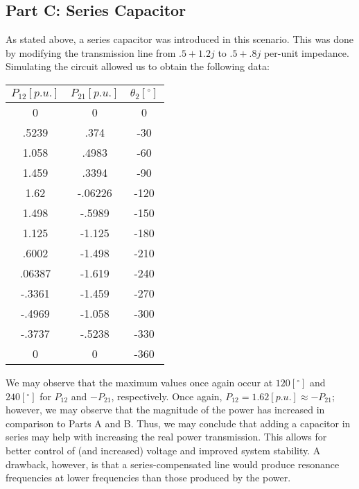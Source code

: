 \documentclass[
	letterpaper, %
	10pt, %
]{CSUniSchoolLabReport}
\begin{document}
\subsection{Part C: Series Capacitor}

As stated above, a series capacitor was introduced in this scenario. This was done by modifying the transmission line from $.5+1.2j$ to $.5+.8j$ per-unit impedance. Simulating the circuit allowed us to obtain the following data:

\begin{center}
  \begin{tabular}[H]{|c|c|c|}
    \hline
    $P_{12}[p.u.]$ & $P_{21}[p.u.]$ & $\theta_2[^{\circ}]$\\
    \hline
    0 & 0 & 0\\
    \hline
    .5239 & .374 & -30\\
    \hline
    1.058 & .4983 & -60\\
    \hline
    1.459 & .3394 & -90\\
    \hline
    \cellcolor{green} 1.62  & -.06226 & -120\\
    \hline
    1.498 & -.5989 & -150\\
    \hline
    1.125 & -1.125 & -180\\
    \hline
    .6002 & -1.498 & -210\\
    \hline
    .06387 & \cellcolor{red} -1.619 & -240\\
    \hline
    -.3361 & -1.459 & -270\\
    \hline
    -.4969 & -1.058 & -300\\
    \hline
    -.3737 & -.5238 & -330\\
    \hline
    0 & 0 & -360\\
    \hline
  \end{tabular}
\end{center}

We may observe that the maximum values once again occur at $120\left[ ^{\circ} \right]$ and $240\left[ ^{\circ} \right]$ for $P_{12}$ and $-P_{21}$, respectively. Once again, $P_{12}=1.62[p.u.]\approx -P_{21}$; however, we may observe that the magnitude of the power has increased in comparison to Parts A and B. Thus, we may conclude that adding a capacitor in series may help with increasing the real power transmission. This allows for better control of (and increased) voltage and improved system stability. A drawback, however, is that a series-compensated line would produce resonance frequencies at lower frequencies than those produced by the power.
\end{document}
